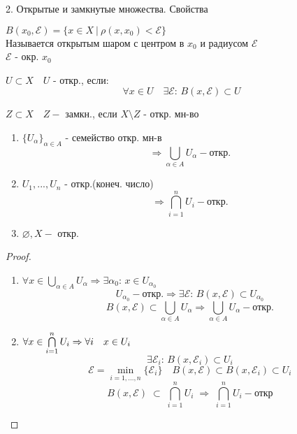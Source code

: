 \documentclass[11pt, fleqn]{article}
\begin{document}
    \begin{question}{2. Открытые и замкнутые множества. Свойства}
        \begin{definition}
            $B(x_0, \mathcal{E}) = \{x \in X \ | \ \rho(x, x_0) < \mathcal{E}\}$\\
            Называется открытым шаром с центром в $x_0$ и радиусом $\mathcal{E}$\\
            $\mathcal{E}$ - окр.  $x_0$
        \end{definition}

        \begin{definition}
            $U \subset X \quad U$ - откр., если:
            \[\forall x \in U \quad \exists \mathcal{E}\text{: } B(x, \mathcal{E}) \subset U\]
        \end{definition}

        \begin{definition}
            $Z \subset X \quad Z -$ замкн., если $X \setminus Z$ - откр. мн-во
        \end{definition}

        \begin{theorem}[св-ва откр. мн-в]
            \begin{enumerate}
                \item $\{ U_\alpha \}_{\alpha \in A}$ - семейство откр. мн-в
                       \[\Rightarrow \bigcup_{\alpha \in A}U_\alpha - \text{откр.}\]
                \item $U_1,...,U_n$ - откр.(конеч. число) \[\Rightarrow \bigcap_{i = 1}^n U_i - \text{откр.}\]
                \item $\varnothing, X - $ откр.
            \end{enumerate}
        \end{theorem}
        \begin{proof}
            \begin{enumerate}
                \item $\forall x \in \bigcup\limits_{\alpha \in A} U_\alpha \Rightarrow \exists \alpha_0\text{: } x \in U_{\alpha_0}$
                       \[U_{\alpha_0} - \text{откр.}\Rightarrow \exists \mathcal{E}\text{: } B(x, \mathcal{E}) \subset U_{\alpha_0}\]
                       \[B(x, \mathcal{E}) \subset \bigcup_{\alpha \in A} U_\alpha \Rightarrow
                       \bigcup_{\alpha \in A} U_\alpha - \text{откр.}\]
                \item $\forall x \in \bigcap\limits_{i = 1}^n U_i \Rightarrow \forall i \quad x \in U_i$
                      \[\exists \mathcal{E}_i\text{: } B(x, \mathcal{E}_i) \subset U_i\]
                      \[\mathcal{E} = \min_{i = 1,..., n}\{\mathcal{E}_i\} \quad B(x, \mathcal{E}) \subset B(x, \mathcal{E}_i) \subset U_i\]
                      \[B(x, \mathcal{E}) \;\subset\; \bigcap\limits_{i=1}^n U_i\; \Rightarrow\; \bigcap\limits_{i = 1} ^ n U_i - \text{откр}\]
            \end{enumerate}
        \end{proof}


\end{question}
\end{document}
